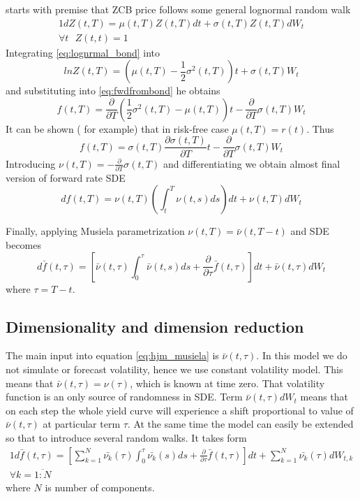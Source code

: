 \documentclass[11pt]{article} %
\begin{document}
\cite[ch. 37]{PWoQF06} starts with premise that ZCB price follows some general lognormal random walk
\begin{alignat}{1} \label{eq:lognrmal_bond}
dZ(t,T) = \mu(t,T)Z(t,T)dt + \sigma(t,T)Z(t,T)dW_{t}\\
\forall t \text{ } Z(t,t) = 1 \nonumber
\end{alignat}
Integrating  \eqref{eq:lognrmal_bond} into 
\begin{equation}
lnZ(t,T) = \left(\mu(t,T)-  \frac{1}{2}\sigma^2(t,T)\right)t +\sigma(t,T)W_{t}
\end{equation}
and substituting into \eqref{eq:fwdfrombond} he obtains
\begin{equation}
f(t,T) = \frac{\partial}{\partial T}\left(\frac{1}{2}\sigma ^2(t,T) - \mu(t,T)\right) t-\frac{\partial}{\partial T}\sigma(t,T)W_{t}
\end{equation}
It can be shown (\cite[par. 10.3.2]{Shreve08} for example) that in risk-free case $\mu(t,T) = r(t)$. Thus 
\begin{equation}
f(t,T) = \sigma(t,T)\frac{\partial \sigma(t,T)}{\partial T}t-\frac{\partial}{\partial T}\sigma(t,T)W_{t}
\end{equation}
Introducing $\nu(t,T) = -\frac{\partial}{\partial T}\sigma(t,T)$ and differentiating we obtain almost final version of forward rate SDE
\begin{equation}
df(t,T) = \nu(t,T)\left(\int_{t}^{T}\nu(t,s)ds\right)dt + \nu(t,T)dW_{t} \nonumber
\end{equation} 

Finally, applying Musiela parametrization $\nu(t,T) = \bar{\nu}(t,T-t)$ and SDE becomes
\begin{equation} \label{eq:hjm_musiela}
d\bar{f}(t,\tau) = \left[\bar{\nu}(t,\tau)\int_{0}^{\tau}\bar{\nu}(t,s)ds+ \frac{\partial}{\partial \tau}\bar{f}(t,\tau)\right]dt + \bar{\nu}(t,\tau)dW_{t} 
\end{equation}
where $\tau = T-t$.

\subsection{Dimensionality and dimension reduction}
The main input into equation \eqref{eq:hjm_musiela} is $\bar{\nu}(t,\tau)$. In this model we do not simulate or forecast volatility, hence we use constant volatility model. This means that $\bar{\nu}(t,\tau) = \nu(\tau)$, which is known at time zero. That volatility function is an only source of randomness in SDE. Term $\bar{\nu}(t,\tau)dW_t$ means that on each step the whole yield curve will experience a shift proportional to value of $\bar{\nu}(t,\tau)$ at particular term $\tau$. At the same time the model can easily be extended so that to introduce several random walks. It takes form
\begin{alignat}{1} \label{eq:hjm_musiela_multidim}
d\bar{f}(t,\tau) = \left[\sum_{k=1}^N\bar{\nu_k}(\tau)\int_{0}^{\tau}\bar{\nu_k}(s)ds+ \frac{\partial}{\partial \tau}\bar{f}(t,\tau)\right]dt + \sum_{k=1}^N\bar{\nu_k}(\tau)dW_{t, k}\\
\forall k = \overline{1:N} \nonumber
\end{alignat}
where $N$ is number of components.
\end{document}
